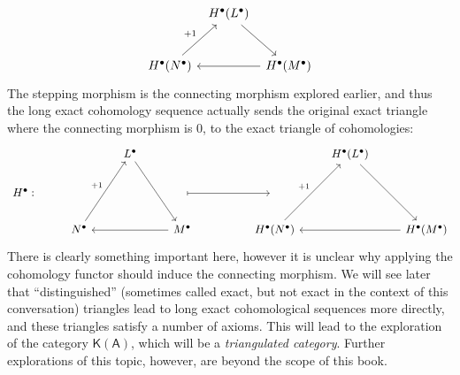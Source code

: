 \[\begin{tikzcd}[row sep = 2.5em, column sep = .5em]
	&H^\bullet (L^\bullet) \ar[dr]\\
	H^\bullet (N^\bullet )\ar[ur, "+1"]&&H^\bullet (M^\bullet)\ar[ll] 
\end{tikzcd}\]
The stepping morphism is the connecting morphism explored earlier, and thus the long exact cohomology sequence actually sends the original exact triangle where the connecting morphism is 0, to the exact triangle of cohomologies:
\[\begin{tikzcd}
	&&L^\bullet \ar[ddr]&&&&H^\bullet (L^\bullet )\ar[ddr]\\
	H^\bullet :&&&{}\ar[rr, mapsto]&&{} \\
		   &N^\bullet \ar[uur, "+1"]&&M^\bullet \ar[ll]&&H^\bullet (N^\bullet )\ar[uur, "+1"]&&H^\bullet (M^\bullet )\ar[ll]
\end{tikzcd}\]
There is clearly something important here, however it is unclear why applying the cohomology functor should induce the connecting morphism. We will see later that ``distinguished'' (sometimes called exact, but not exact in the context of this conversation) triangles lead to long exact cohomological sequences more directly, and these triangles satisfy a number of axioms. This will lead to the exploration of the category $\mathsf{K} (\mathsf{A} )$, which will be a \emph{triangulated category}. Further explorations of this topic, however, are beyond the scope of this book.
